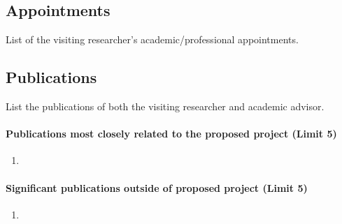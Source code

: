 \documentclass{article}
\begin{document}
\subsection{Appointments}
List of the visiting researcher's academic/professional appointments.\\

\subsection{Publications}
List the publications of both the visiting researcher and academic advisor.
\paragraph{Publications most closely related to the proposed project \textnormal{(Limit 5)}}
\begin{enumerate}
\item
\end{enumerate}

\paragraph{Significant publications outside of proposed project \textnormal{(Limit 5)}}
\begin{enumerate}
\item
\end{enumerate}
\end{document}
